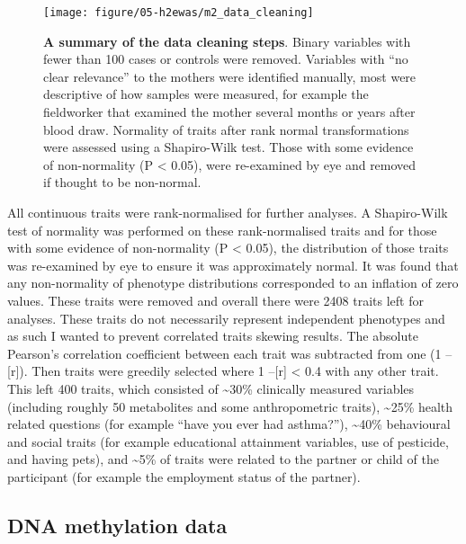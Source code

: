 \documentclass[11pt,twoside]{bristolthesis}
\begin{document}
\begin{figure}[!hp]

{\centering \texttt{[image: figure/05-h2ewas/m2\_data\_cleaning]} 

}

\caption[A summary of the data cleaning steps]{\textbf{A summary of the data cleaning steps}. Binary variables with fewer than 100 cases or controls were removed. Variables with ``no clear relevance'' to the mothers were identified manually, most were descriptive of how samples were measured, for example the fieldworker that examined the mother several months or years after blood draw. Normality of traits after rank normal transformations were assessed using a Shapiro-Wilk test. Those with some evidence of non-normality (P \textless{} 0.05), were re-examined by eye and removed if thought to be non-normal.}\label{fig:h2ewas-pheno-qc}
\end{figure}
All continuous traits were rank-normalised for further analyses. A Shapiro-Wilk test of normality was performed on these rank-normalised traits and for those with some evidence of non-normality (P \textless{} 0.05), the distribution of those traits was re-examined by eye to ensure it was approximately normal. It was found that any non-normality of phenotype distributions corresponded to an inflation of zero values. These traits were removed and overall there were 2408 traits left for analyses. These traits do not necessarily represent independent phenotypes and as such I wanted to prevent correlated traits skewing results. The absolute Pearson's correlation coefficient between each trait was subtracted from one (1 --{[}r{]}). Then traits were greedily selected where 1 --{[}r{]} \textless{} 0.4 with any other trait. This left 400 traits, which consisted of \textasciitilde30\% clinically measured variables (including roughly 50 metabolites and some anthropometric traits), \textasciitilde25\% health related questions (for example ``have you ever had asthma?''), \textasciitilde40\% behavioural and social traits (for example educational attainment variables, use of pesticide, and having pets), and \textasciitilde5\% of traits were related to the partner or child of the participant (for example the employment status of the partner).

\hypertarget{dna-methylation-data-05}{%
\subsection{DNA methylation data}\label{dna-methylation-data-05}}
\end{document}
